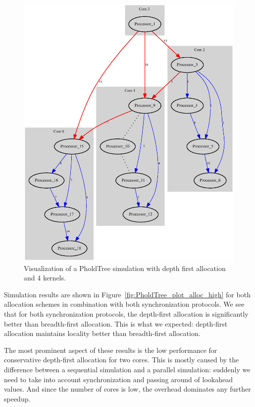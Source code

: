 \begin{figure}
\begin{minipage}{0.45\textwidth}
            \includegraphics[width=\textwidth]{fig/pholdtreed1n3t5000c4DFS.eps}
            \caption{Visualization of a PholdTree simulation with depth first allocation and 4 kernels.}
            \label{fig:pholdtree_visualize_parDFS}
    \end{minipage}
\end{figure}

Simulation results are shown in Figure~\ref{fig:PholdTree_plot_alloc_high} for both allocation schemes in combination with both synchronization protocols.
We see that for both synchronization protocols, the depth-first allocation is significantly better than breadth-first allocation.
This is what we expected: depth-first allocation maintains locality better than breadth-first allocation.

The most prominent aspect of these results is the low performance for conservative depth-first allocation for two cores.
This is mostly caused by the difference between a sequential simulation and a parallel simulation: suddenly we need to take into account synchronization and passing around of lookahead values.
And since the number of cores is low, the overhead dominates any further speedup.

